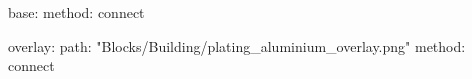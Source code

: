 base:
  method: connect

overlay:
  path: "Blocks/Building/plating_aluminium_overlay.png"
  method: connect
